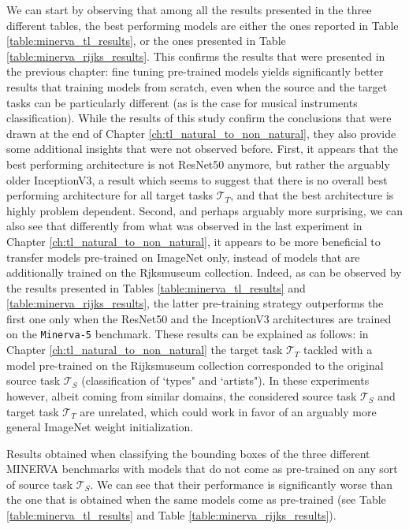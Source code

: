 We can start by observing that among all the results presented in the three different tables, the best performing models are either the ones reported in Table \ref{table:minerva_tl_results}, or the ones presented in Table \ref{table:minerva_rijks_results}. This confirms the results that were presented in the previous chapter: fine tuning pre-trained models yields significantly better results that training models from scratch, even when the source and the target tasks can be particularly different (as is the case for musical instruments classification). While the results of this study confirm the conclusions that were drawn at the end of Chapter \ref{ch:tl_natural_to_non_natural}, they also provide some additional insights that were not observed before. First, it appears that the best performing architecture is not ResNet50 anymore, but rather the arguably older InceptionV3, a result which seems to suggest that there is no overall best performing architecture for all target tasks $\mathcal{T}_T$, and that the best architecture is highly problem dependent. Second, and perhaps arguably more surprising, we can also see that differently from what was observed in the last experiment in Chapter \ref{ch:tl_natural_to_non_natural}, it appears to be more beneficial to transfer models pre-trained on ImageNet only, instead of models that are additionally trained on the Rjksmuseum collection. Indeed, as can be observed by the results presented in Tables \ref{table:minerva_tl_results} and \ref{table:minerva_rijks_results}, the latter pre-training strategy outperforms the first one only when the ResNet50 and the InceptionV3 architectures are trained on the \texttt{Minerva-5} benchmark. These results can be explained as follows: in Chapter \ref{ch:tl_natural_to_non_natural} the target task $\mathcal{T}_T$ tackled with a model pre-trained on the Rijksmuseum collection corresponded to the original source task $\mathcal{T}_S$ (classification of `types" and `artists"). In these experiments however, albeit coming from similar domains, the considered source task $\mathcal{T}_S$ and target task $\mathcal{T}_T$ are unrelated, which could work in favor of an arguably more general ImageNet weight initialization.


\begin{table}
	\caption{Results obtained when classifying the bounding boxes of the three different MINERVA benchmarks with models that do not come as pre-trained on any sort of source task $\mathcal{T}_S$. We can see that their performance is significantly worse than the one that is obtained when the same models come as pre-trained (see Table \ref{table:minerva_tl_results} and Table \ref{table:minerva_rijks_results}).}
\resizebox{\columnwidth}{!}{%
}
\label{table:minerva_no_tl_results}
\end{table}



